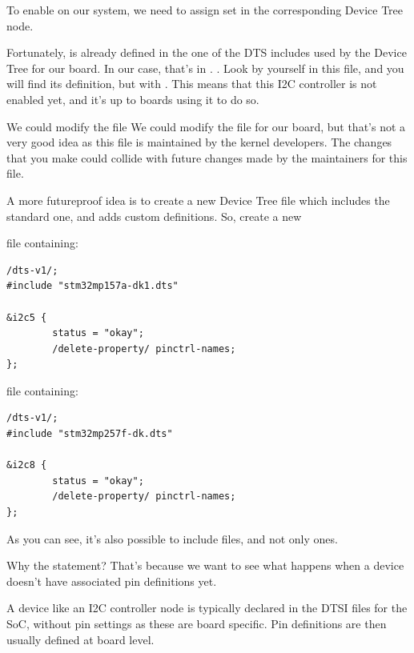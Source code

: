 To enable \busname on our system, we need to assign set  in the corresponding Device Tree node.

Fortunately, \busname is already defined in the one of the DTS includes
used by the Device Tree for our board. In our case, that's in
\if{}
.
\fi
\if{}
.
\fi
Look by yourself in this
file, and you will find its definition, but with . This means that this I2C controller is not enabled yet,
and it's up to boards using it to do so.

\if{}
We could modify the  file
\fi
\if{}
We could modify the  file
\fi
for our board, but that's not a very good idea as this file is
maintained by the kernel developers. The changes that you make could
collide with future changes made by the maintainers for this file.

A more futureproof idea is to create a new Device Tree file which
includes the standard one, and adds custom definitions. So, create a
new

\if{}
 file containing:
\begin{verbatim}
/dts-v1/;
#include "stm32mp157a-dk1.dts"

&i2c5 {
        status = "okay";
        /delete-property/ pinctrl-names;
};
\end{verbatim}
\fi
\if{}
 file containing:
\begin{verbatim}
/dts-v1/;
#include "stm32mp257f-dk.dts"

&i2c8 {
        status = "okay";
        /delete-property/ pinctrl-names;
};
\end{verbatim}
\fi

As you can see, it's also possible to include  files, and not
only  ones.

Why the  statement? That's because we want
to see what happens when a device doesn't have associated pin
definitions yet.

A device like an I2C controller node is typically declared in the DTSI
files for the SoC, without pin settings as these are board
specific. Pin definitions are then usually defined at board level.

